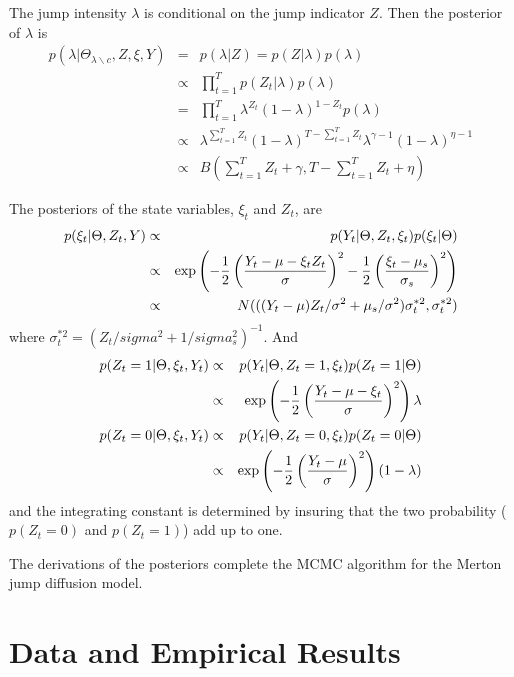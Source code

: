 \documentclass[11pt,reqno,final]{amsart}
\def\exp{\hbox{\rm exp}}
\begin{document}
The jump intensity $\lambda$ is conditional on the jump indicator $Z$. Then the posterior of $\lambda$ is
\begin{eqnarray*}
p(\lambda|\Theta_{\lambda \backslash c}, Z, \xi, Y) &=& p(\lambda|Z) = p(Z|\lambda)p(\lambda) \\
        &\propto& \prod_{t=1}^T p(Z_t|\lambda)p(\lambda) \\
        &=& \prod_{t=1}^T \lambda^{Z_t} (1-\lambda)^{1-Z_t} p(\lambda) \\
        &\propto& \lambda^{\sum_{t=1}^T Z_t} (1-\lambda)^{T-\sum_{t=1}^T Z_t} \lambda^{\gamma-1}(1-\lambda)^{\eta-1} \\
        &\propto& B\left(\sum_{t=1}^T Z_t + \gamma, T - \sum_{t=1}^T Z_t + \eta \right)
\end{eqnarray*}

The posteriors of the state variables, $\xi_t$ and $Z_t$, are
\begin{eqnarray*}
p(\xi_t|\Theta, Z_t, Y) &\propto& p(Y_t|\Theta, Z_t, \xi_t) p(\xi_t|\Theta) \\
    &\propto& \exp\left( -\frac{1}{2} \left( \frac{Y_t-\mu-\xi_t Z_t}{\sigma} \right)^2 - \frac{1}{2} \left(\frac{\xi_t-\mu_s}{\sigma_s}\right)^2 \right) \\
    &\propto& N(((Y_t-\mu)Z_t/\sigma^2+\mu_s/\sigma^2)\sigma_t^{*2}, \sigma_t^{*2})
\end{eqnarray*}
where $\sigma_t^{*2}=(Z_t/sigma^2+1/sigma_s^2)^{-1}$. And
\begin{eqnarray*}
p(Z_t=1|\Theta, \xi_t, Y_t) &\propto& p(Y_t|\Theta, Z_t=1, \xi_t)p(Z_t=1|\Theta) \\
    &\propto& \exp\left( -\frac{1}{2} \left( \frac{Y_t-\mu-\xi_t}{\sigma} \right)^2 \right) \lambda \\
p(Z_t=0|\Theta, \xi_t, Y_t) &\propto& p(Y_t|\Theta, Z_t=0, \xi_t)p(Z_t=0|\Theta) \\
    &\propto& \exp\left( -\frac{1}{2} \left( \frac{Y_t-\mu}{\sigma} \right)^2 \right) (1-\lambda) \\
\end{eqnarray*}
and the integrating constant is determined by insuring that the two probability ($p(Z_t=0)$ and $p(Z_t=1)$) add up to one.

The derivations of the posteriors complete the MCMC algorithm for the Merton jump diffusion model.


\section{Data and Empirical Results}
\end{document}
